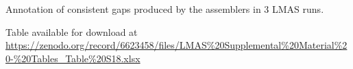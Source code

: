 \begin{table}[]
\centering
\caption{Annotation of consistent gaps produced by the assemblers in 3 LMAS runs.}
\label{tab:ch5_suptable18}
Table available for download at \url{https://zenodo.org/record/6623458/files/LMAS\%20Supplemental\%20Material\%20-\%20Tables_Table\%20S18.xlsx}
\end{table}